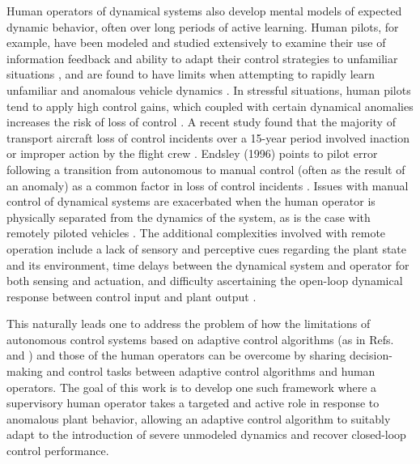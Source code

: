 Human operators of dynamical systems also develop mental models of expected dynamic behavior, often over long periods of active learning. Human pilots, for example, have been modeled and studied extensively to examine their use of information feedback and ability to adapt their control strategies to unfamiliar situations \cite{mcruer1967review, phatak1969model}, and are found to have limits when attempting to rapidly learn unfamiliar and anomalous vehicle dynamics \cite{hess2012modeling, hess2015modeling, endsley1995toward, zaal2016manual, oliver2017cognition}. In stressful situations, human pilots tend to apply high control gains, which coupled with certain dynamical anomalies increases the risk of loss of control \cite{hess1997unified}. A recent study found that the majority of transport aircraft loss of control incidents over a 15-year period involved inaction or improper action by the flight crew \cite{belcastro2014preliminary} . Endsley (1996) points to pilot error following a transition from autonomous to manual control (often as the result of an anomaly) as a common factor in loss of control incidents \cite{endsley1996automation}. Issues with manual control of dynamical systems are exacerbated when the human operator is physically separated from the dynamics of the system, as is the case with remotely piloted vehicles \cite{mccarley2004human, tvaryanas2008recurrent}. The additional complexities involved with remote operation include a lack of sensory and perceptive cues regarding the plant state and its environment, time delays between the dynamical system and operator for both sensing and actuation, and difficulty ascertaining the open-loop dynamical response between control input and plant output \cite{lam2008haptic}. 

This naturally leads one to address the problem of how the limitations of autonomous control systems based on adaptive control algorithms (as in Refs.~\cite{narendra2012stable} and \cite{lavretsky2013robust}) and those of the human operators can be overcome by sharing decision-making and control tasks between adaptive control algorithms and human operators. The goal of this work is to develop one such framework where a supervisory human operator takes a targeted and active role in response to anomalous plant behavior, allowing an adaptive control algorithm to suitably adapt to the introduction of severe unmodeled dynamics and recover closed-loop control performance.  

